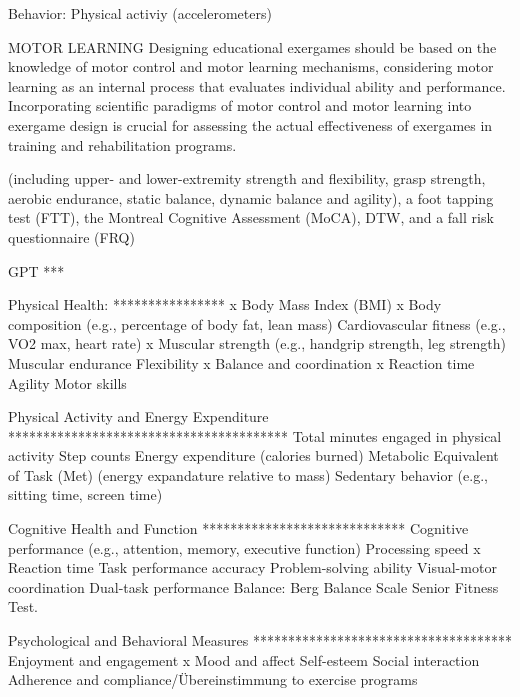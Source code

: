 Behavior:
Physical activiy (accelerometers)


MOTOR LEARNING
Designing educational exergames should be based on the knowledge of motor control and motor learning mechanisms, considering motor learning as an internal process that evaluates individual ability and performance. Incorporating scientific paradigms of motor control and motor learning into exergame design is crucial for assessing the actual effectiveness of exergames in training and rehabilitation programs. \cite{di2012exergames}

\cite{peng2020novel}
(including upper- and lower-extremity strength and flexibility, grasp strength, aerobic endurance, static balance, dynamic balance and agility), a foot tapping test (FTT), the Montreal Cognitive Assessment (MoCA), DTW, and a fall risk questionnaire (FRQ) 

GPT
***

Physical Health:
****************
x Body Mass Index (BMI)
x Body composition (e.g., percentage of body fat, lean mass)
Cardiovascular fitness (e.g., VO2 max, heart rate)
x Muscular strength (e.g., handgrip strength, leg strength)
Muscular endurance
Flexibility
x Balance and coordination
x Reaction time
Agility
Motor skills

Physical Activity and Energy Expenditure
****************************************
Total minutes engaged in physical activity
Step counts
Energy expenditure (calories burned)
Metabolic Equivalent of Task (Met) (energy expandature relative to mass)
Sedentary behavior (e.g., sitting time, screen time)

Cognitive Health and Function
*****************************
Cognitive performance (e.g., attention, memory, executive function)
Processing speed
x Reaction time
Task performance accuracy
Problem-solving ability
Visual-motor coordination
Dual-task performance
Balance:					Berg Balance Scale
                            Senior Fitness Test.

Psychological and Behavioral Measures
*************************************
Enjoyment and engagement
x Mood and affect
Self-esteem
Social interaction
Adherence and compliance/Übereinstimmung to exercise programs



